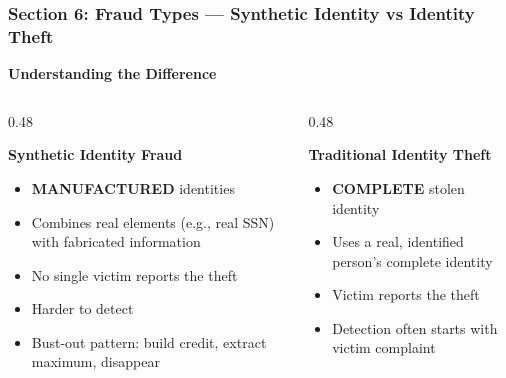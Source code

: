 \documentclass[12pt,aspectratio=169]{beamer}
\renewcommand{\scriptsize}{\fontsize{5}{6}\selectfont}
\begin{document}
	\begin{frame}
		\frametitle{\fontsize{13}{15}\selectfont \textbf{Section 6: Fraud Types — Synthetic Identity vs Identity Theft}}
		\vspace{0.3cm}
		\begin{center}
			{\fontsize{12}{14}\selectfont \textbf{Understanding the Difference}}
		\end{center}
		\vspace{0.2cm}
		\begin{columns}[T]
			\begin{column}{0.48\textwidth}
				\begin{block}{\textbf{Synthetic Identity Fraud}}
					\scriptsize
					\begin{itemize}
						\item \textbf{MANUFACTURED} identities
						\item Combines real elements (e.g., real SSN) with fabricated information
						\item No single victim reports the theft
						\item Harder to detect
						\item Bust-out pattern: build credit, extract maximum, disappear
					\end{itemize}
				\end{block}
			\end{column}
			\begin{column}{0.48\textwidth}
				\begin{block}{\textbf{Traditional Identity Theft}}
					\scriptsize
					\begin{itemize}
						\item \textbf{COMPLETE} stolen identity
						\item Uses a real, identified person's complete identity
						\item Victim reports the theft
						\item Detection often starts with victim complaint
					\end{itemize}
				\end{block}
			\end{column}
		\end{columns}
	\end{frame}
	
\end{document}
